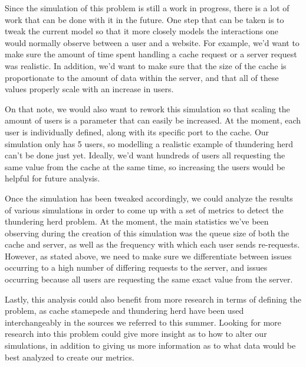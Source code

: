\documentclass{article}
\begin{document}
Since the simulation of this problem is still a work in progress, there is a lot of work that can be done with it in the future.  One step that can be taken is to tweak the current model so that it more closely models the interactions one would normally observe between a user and a website.  For example, we'd want to make sure the amount of time spent handling a cache request or a server request was realistic.  In addition, we'd want to make sure that the size of the cache is proportionate to the amount of data within the server, and that all of these values properly scale with an increase in users. \newline

On that note, we would also want to rework this simulation so that scaling the amount of users is a parameter that can easily be increased.  At the moment, each user is individually defined, along with its specific port to the cache.  Our simulation only has 5 users, so modelling a realistic example of thundering herd can't be done just yet. Ideally, we'd want hundreds of users all requesting the same value from the cache at the same time, so increasing the users would be helpful for future analysis. \newline

Once the simulation has been tweaked accordingly, we could analyze the results of various simulations in order to come up with a set of metrics to detect the thundering herd problem.  At the moment, the main statistics we've been observing during the creation of this simulation was the queue size of both the cache and server, as well as the frequency with which each user sends re-requests.  However, as stated above, we need to make sure we differentiate between issues occurring to a high number of differing requests to the server, and issues occurring because all users are requesting the same exact value from the server. \newline

Lastly, this analysis could also benefit from more research in terms of defining the problem, as cache stamepede and thundering herd have been used interchangeably in the sources we referred to this summer.  Looking for more research into this problem could give more insight as to how to alter our simulations, in addition to giving us more information as to what data would be best analyzed to create our metrics. 
\end{document}
